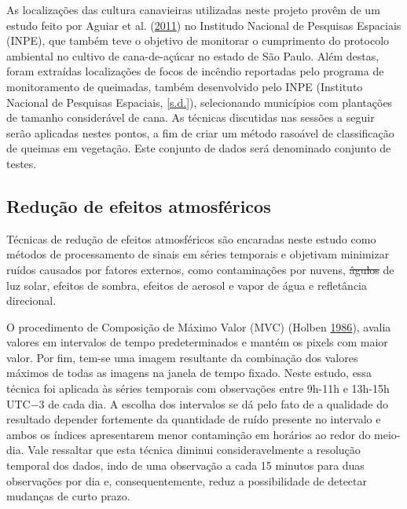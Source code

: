 \documentclass[11pt,brazil,]{article}
\providecommand{\DIFaddtex}[1]{{\protect\color{blue}\uwave{#1}}} %
\providecommand{\DIFdeltex}[1]{{\protect\color{red}\sout{#1}}}                      %
\providecommand{\DIFaddbegin}{} %
\providecommand{\DIFaddend}{} %
\providecommand{\DIFdelbegin}{} %
\providecommand{\DIFdelend}{} %
\providecommand{\DIFadd}[1]{\texorpdfstring{\DIFaddtex{#1}}{#1}} %
\providecommand{\DIFdel}[1]{\texorpdfstring{\DIFdeltex{#1}}{}} %
\newcommand{\DIFscaledelfig}{0.5}
\newlength{\DIFdelgraphicswidth} %
\newlength{\DIFdelgraphicsheight} %
\newcommand{\DIFaddincludegraphics}[2][]{{\color{blue}\fbox{\DIFOincludegraphics[#1]{#2}}}} %
\newcommand{\DIFdelincludegraphics}[2][]{%
\sbox{\DIFdelgraphicsbox}{\DIFOincludegraphics[#1]{#2}}%
\settoboxwidth{\DIFdelgraphicswidth}{\DIFdelgraphicsbox} %
\settoboxtotalheight{\DIFdelgraphicsheight}{\DIFdelgraphicsbox} %
\scalebox{\DIFscaledelfig}{%
\parbox[b]{\DIFdelgraphicswidth}{\usebox{\DIFdelgraphicsbox}\\[-\baselineskip] \rule{\DIFdelgraphicswidth}{0em}}\llap{\resizebox{\DIFdelgraphicswidth}{\DIFdelgraphicsheight}{%
\setlength{\unitlength}{\DIFdelgraphicswidth}%
\begin{picture}(1,1)%
\thicklines\linethickness{2pt} %
{\color[rgb]{1,0,0}\put(0,0){\framebox(1,1){}}}%
{\color[rgb]{1,0,0}\put(0,0){\line( 1,1){1}}}%
{\color[rgb]{1,0,0}\put(0,1){\line(1,-1){1}}}%
\end{picture}%
}\hspace*{3pt}}} %
} %
\DeclareRobustCommand{\DIFaddbegin}{\DIFOaddbegin \let\includegraphics\DIFaddincludegraphics} %
\DeclareRobustCommand{\DIFaddend}{\DIFOaddend \let\includegraphics\DIFOincludegraphics} %
\DeclareRobustCommand{\DIFdelbegin}{\DIFOdelbegin \let\includegraphics\DIFdelincludegraphics} %
\DeclareRobustCommand{\DIFdelend}{\DIFOaddend \let\includegraphics\DIFOincludegraphics} %
\begin{document}
As localizações das cultura canavieiras utilizadas neste projeto provêm
de um estudo feito por Aguiar et al.
(\protect\hyperlink{ref-aguiar2011remote}{2011}) no Institudo Nacional
de Pesquisas Espaciais (INPE), que também teve o objetivo de monitorar o
cumprimento do protocolo ambiental no cultivo de cana-de-açúcar no
estado de São Paulo. Além destas, foram extraídas localizações de focos
de incêndio reportadas pelo programa de monitoramento de queimadas,
também desenvolvido pelo INPE (Instituto Nacional de Pesquisas
Espaciais, \protect\hyperlink{ref-inpe}{{[}s.d.{]}}), selecionando
municípios com plantações de tamanho considerável de cana. As técnicas
discutidas nas sessões a seguir serão aplicadas nestes pontos, a fim de
criar um método rasoável de classificação de queimas em vegetação. Este
conjunto de dados será denominado conjunto de testes.

\hypertarget{reducao-de-efeitos-atmosfericos}{%
\subsection{Redução de efeitos
atmosféricos}\label{reducao-de-efeitos-atmosfericos}}

Técnicas de redução de efeitos atmosféricos são encaradas neste estudo
como métodos de processamento de sinais em séries temporais e objetivam
minimizar ruídos causados por fatores externos, como contaminações por
nuvens, \DIFdelbegin \DIFdel{âgulos }\DIFdelend \DIFaddbegin \DIFadd{ângulos }\DIFaddend de luz solar, efeitos de sombra, efeitos de aerosol e
vapor de água e refletância direcional.

O procedimento de Composição de Máximo Valor (MVC) (Holben
\protect\hyperlink{ref-holben1986characteristics}{1986}), avalia valores
em intervalos de tempo predeterminados e mantém os pixels com maior
valor. Por fim, tem-se uma imagem resultante da combinação dos valores
máximos de todas as imagens na janela de tempo fixado. Neste estudo,
essa técnica foi aplicada às séries temporais com observações entre
9h-11h e 13h-15h UTC−3 de cada dia. A escolha dos intervalos se dá pelo
fato de a qualidade do resultado depender fortemente da quantidade de
ruído presente no intervalo e ambos os índices apresentarem menor
contaminção em horários ao redor do meio-dia. Vale ressaltar que esta
técnica diminui consideravelmente a resolução temporal dos dados, indo
de uma observação a cada 15 minutos para duas observações por dia e,
consequentemente, reduz a possibilidade de detectar mudanças de curto
prazo.
\end{document}

